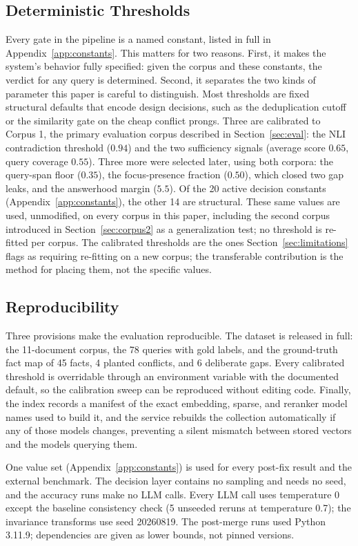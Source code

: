 \documentclass[conference]{IEEEtran}
\begin{document}
\subsection{Deterministic Thresholds}
Every gate in the pipeline is a named constant, listed in full in
Appendix~\ref{app:constants}. This matters for two reasons. First, it makes
the system's behavior fully specified: given the corpus and these
constants, the verdict for any query is determined. Second, it separates
the two kinds of parameter this paper is careful to distinguish. Most
thresholds are fixed structural defaults that encode design decisions, such
as the deduplication cutoff or the similarity gate on the cheap conflict
prongs. Three are calibrated to Corpus 1, the primary evaluation corpus
described in Section~\ref{sec:eval}: the NLI contradiction threshold
($0.94$) and the two sufficiency signals (average score $0.65$, query
coverage $0.55$). Three more were selected later, using both corpora: the
query-span floor ($0.35$), the focus-presence fraction ($0.50$), which
closed two gap leaks, and the answerhood margin ($5.5$). Of the 20 active
decision constants (Appendix~\ref{app:constants}), the other 14 are
structural. These same values are used, unmodified, on every corpus in
this paper, including the second corpus introduced in
Section~\ref{sec:corpus2} as a generalization test; no threshold is
re-fitted per corpus. The calibrated thresholds are the ones
Section~\ref{sec:limitations} flags as requiring re-fitting on a new
corpus; the transferable contribution is the method for placing them, not
the specific values.

\subsection{Reproducibility}
Three provisions make the evaluation reproducible. The dataset is released
in full: the 11-document corpus, the 78 queries with gold labels, and the
ground-truth fact map of 45 facts, 4 planted conflicts, and 6 deliberate
gaps. Every calibrated threshold is overridable through an environment
variable with the documented default, so the calibration sweep can be
reproduced without editing code. Finally, the index records a manifest of
the exact embedding, sparse, and reranker model names used to build it, and
the service rebuilds the collection automatically if any of those models
changes, preventing a silent mismatch between stored vectors and the models
querying them.

One value set (Appendix~\ref{app:constants}) is used for every post-fix
result and the external benchmark. The decision layer contains no sampling
and needs no seed, and the accuracy runs make no LLM calls. Every LLM call
uses temperature 0 except the baseline consistency check (5 unseeded reruns
at temperature 0.7); the invariance transforms use seed 20260819. The
post-merge runs used Python 3.11.9; dependencies are given as lower bounds,
not pinned versions.
\end{document}
